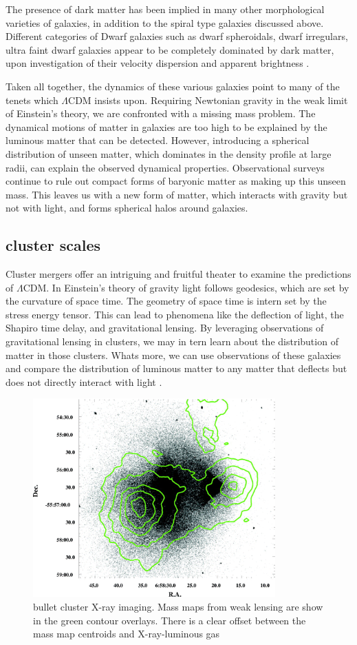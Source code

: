 \documentclass[12pt]{article}
\begin{document}
The presence of dark matter has been implied in many other morphological varieties of galaxies, in addition to the spiral type galaxies discussed above. Different categories of Dwarf galaxies such as dwarf spheroidals, dwarf irregulars, ultra faint dwarf galaxies appear to be completely dominated by dark matter, upon investigation of their velocity dispersion and apparent brightness \cite{Simon2007}.

Taken all together, the dynamics of these various galaxies point to many of the tenets which $\Lambda$CDM insists upon. Requiring Newtonian gravity in the weak limit of Einstein's theory, we are confronted with a missing mass problem. The dynamical motions of matter in galaxies are too high to be explained by the luminous matter that can be detected. However, introducing a spherical distribution of unseen matter, which dominates in the density profile at large radii, can explain the observed dynamical properties. Observational surveys continue to rule out compact forms of baryonic matter as making up this unseen mass. This leaves us with a new form of matter, which interacts with gravity but not with light, and forms spherical halos around galaxies.

\subsection{cluster scales}
Cluster mergers offer an intriguing and fruitful theater to examine the predictions of $\Lambda$CDM. In Einstein's theory of gravity light follows geodesics, which are set by the curvature of space time. The geometry of space time is intern set by the stress energy tensor. This can lead to phenomena like the deflection of light, the Shapiro time delay, and gravitational lensing. By leveraging observations of gravitational lensing in clusters, we may in tern learn about the distribution of matter in those clusters. Whats more, we can use observations of these galaxies and compare the distribution of luminous matter to any matter that deflects but does not directly interact with light \cite{Caroll2004}.

\begin{figure}
\centering
\includegraphics[height=3in]{bulletCluster.png}
\caption{bullet cluster X-ray imaging. Mass maps from weak lensing are show in the green contour overlays. There is a clear offset between the mass map centroids and X-ray-luminous gas \cite{Clowe2004}}
\end{figure}
\end{document}
